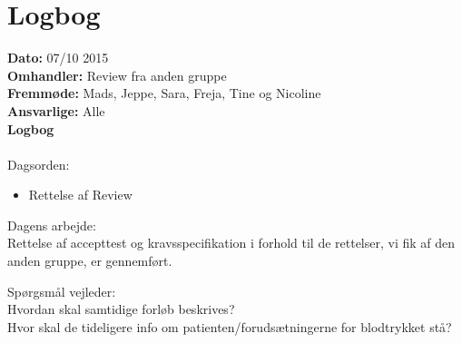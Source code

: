 \chapter{Logbog}

\textbf{Dato:} 07/10 2015\\
\textbf{Omhandler:} Review fra anden gruppe\\
\textbf{Fremmøde:} Mads, Jeppe, Sara, Freja, Tine og Nicoline\\
\textbf{Ansvarlige:} Alle\\
\textbf{Logbog}
\\
\\
Dagsorden:
\begin{itemize}
	\item Rettelse af Review
\end{itemize}

Dagens arbejde: \\
Rettelse af accepttest og kravsspecifikation i forhold til de rettelser, vi fik af den anden gruppe, er gennemført. 

Spørgsmål vejleder: \\
Hvordan skal samtidige forløb beskrives?\\
Hvor skal de tideligere info om patienten/forudsætningerne for blodtrykket stå? \\
\\

